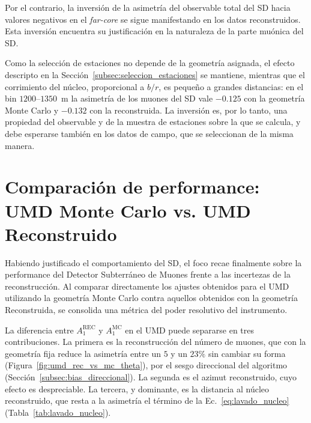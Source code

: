 Por el contrario, la inversión de la asimetría del observable total del SD hacia valores negativos en el \textit{far-core} se sigue manifestando en los datos reconstruidos. Esta inversión encuentra su justificación en la naturaleza de la parte muónica del SD.

{\color{blue}Como la selección de estaciones no depende de la geometría asignada, el efecto descripto en la Sección~\ref{subsec:seleccion_estaciones} se mantiene, mientras que el corrimiento del núcleo, proporcional a $b/r$, es pequeño a grandes distancias: en el bin $1200$--$1350$~m la asimetría de los muones del SD vale $-0.125$ con la geometría Monte Carlo y $-0.132$ con la reconstruida. La inversión es, por lo tanto, una propiedad del observable y de la muestra de estaciones sobre la que se calcula, y debe esperarse también en los datos de campo, que se seleccionan de la misma manera.}

\section{Comparación de performance: UMD Monte Carlo vs. UMD Reconstruido}
\label{subsec:comparacion_performance_umd}

Habiendo justificado el comportamiento del SD, el foco recae finalmente sobre la performance del Detector Subterráneo de Muones frente a las incertezas de la reconstrucción. Al comparar directamente los ajustes obtenidos para el UMD utilizando la geometría Monte Carlo contra aquellos obtenidos con la geometría Reconstruida, se consolida una métrica del poder resolutivo del instrumento.

{\leavevmode\color{blue}La diferencia entre $A_1^{\mathrm{REC}}$ y $A_1^{\mathrm{MC}}$ en el UMD puede separarse en tres contribuciones. La primera es la reconstrucción del número de muones, que con la geometría fija reduce la asimetría entre un $5$ y un $23\%$ sin cambiar su forma (Figura~\ref{fig:umd_rec_vs_mc_theta}), por el sesgo direccional del algoritmo (Sección~\ref{subsec:bias_direccional}). La segunda es el azimut reconstruido, cuyo efecto es despreciable. La tercera, y dominante, es la distancia al núcleo reconstruido, que resta a la asimetría el término de la Ec.~\ref{eq:lavado_nucleo} (Tabla~\ref{tab:lavado_nucleo}).}

